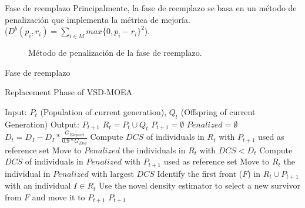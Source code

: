 \documentclass{beamer}
\begin{document}
\begin{frame}{Fase de reemplazo}
Principalmente, la fase de reemplazo se basa en un método de penalización que implementa la métrica de mejoría. \\
($D^b(p_i, r_i) = \sum_{i \in M} max\{0, p_i - r_i\}^2$).
\begin{figure}[t]
\centering

\caption{Método de penalización de la fase de reemplazo.} \label{fig:Hypersphere}
\end{figure}
\end{frame}

\begin{frame}{Fase de reemplazo}
  \begin{algorithm}[H]
  \begin{scriptsize}
	\caption{Replacement Phase of VSD-MOEA} 
\begin{algorithmic}[1]
\STATE Input: $P_t$ (Population of current generation), $Q_t$ (Offspring of current Generation)
    	\STATE Output: $P_{t+1}$ 
        \STATE $R_t = P_t \cup Q_t$ \label{alg:1}
        \STATE $P_{t+1} = \emptyset$ \label{alg:2}
        \STATE $Penalized = \emptyset$ \label{alg:3}
				\STATE $D_t = D_I - D_I * \frac{G_{Elapsed}}{0.9*G_{End}}$ \label{alg:4}
         \label{alg:6}
					\STATE Compute $DCS$ of individuals in $R_t$ with $P_{t+1}$ used as reference set \label{alg:7}
					\STATE Move to $Penalized$ the individuals in $R_t$ with $DCS < D_t$  \label{alg:8}
        	 \label{alg:9}
						\STATE Compute $DCS$ of individuals in $Penalized$ with $P_{t+1}$ used as reference set \label{alg:10}
						\STATE Move to $R_t$ the individual in $Penalized$ with largest $DCS$ \label{alg:11}
        	\ENDIF
					\STATE Identify the first front ($F$) in $R_t \cup P_{t+1}$ with an individual $I \in R_t$ \label{alg:12}
					\STATE Use the novel density estimator  to select a new survivor 
					from $F$ and move it to $P_{t+1}$\label{alg:13}
        \ENDWHILE
    	\RETURN $P_{t+1}$ \label{alg:14}
	\end{algorithmic}

\label{alg:Replacement_Phase}
\end{scriptsize}
\end{algorithm}
\end{frame}
\end{document}
